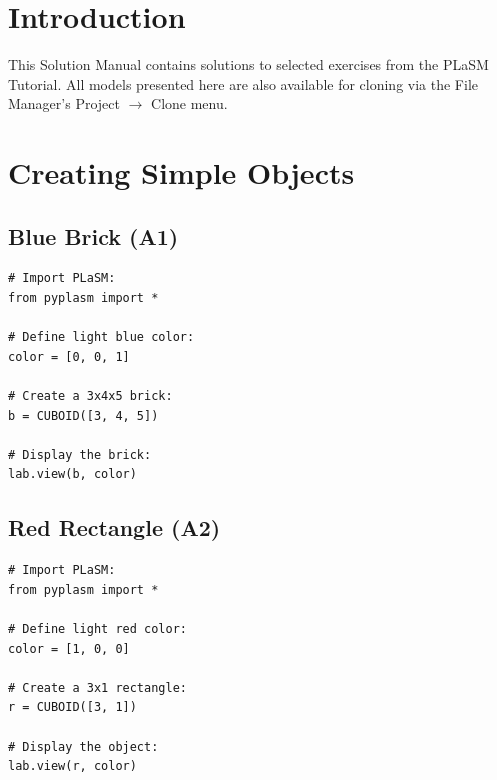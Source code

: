 \documentclass{article}
\begin{document}

\normalsize

\newpage
\setcounter{tocdepth}{2}
\tableofcontents

\newpage

\pagestyle{plain}
\setcounter{page}{1}


\newpage

\pagestyle{plain}

\section{Introduction}

This Solution Manual contains solutions to selected exercises from the 
PLaSM Tutorial. All models presented here are also available for 
cloning via the File Manager's Project $\rightarrow$ Clone menu.

\section{Creating Simple Objects}

\subsection{Blue Brick (A1)}

\begin{verbatim}
# Import PLaSM:
from pyplasm import *

# Define light blue color:
color = [0, 0, 1]

# Create a 3x4x5 brick:
b = CUBOID([3, 4, 5])

# Display the brick:
lab.view(b, color)
\end{verbatim}


\subsection{Red Rectangle (A2)}

\begin{verbatim}
# Import PLaSM:
from pyplasm import *

# Define light red color:
color = [1, 0, 0]

# Create a 3x1 rectangle:
r = CUBOID([3, 1])

# Display the object:
lab.view(r, color)
\end{verbatim}
\end{document}
